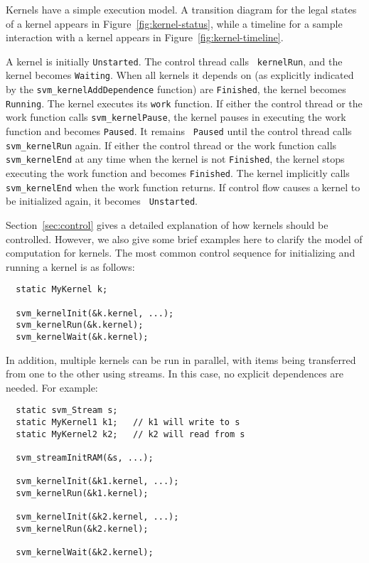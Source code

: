 Kernels have a simple execution model. A transition diagram for the
legal states of a kernel appears in Figure~\ref{fig:kernel-status},
while a timeline for a sample interaction with a kernel appears in
Figure~\ref{fig:kernel-timeline}.

A kernel is initially {\tt Unstarted}.  The control thread calls {\tt
kernelRun}, and the kernel becomes {\tt Waiting}.  When all kernels it
depends on (as explicitly indicated by the {\tt svm\_kernelAddDependence}
function) are {\tt Finished}, the kernel becomes {\tt Running}. The
kernel executes its {\tt work} function.  If either the control thread
or the work function calls {\tt svm\_kernelPause}, the kernel pauses in
executing the work function and becomes {\tt Paused}. It remains {\tt
Paused} until the control thread calls {\tt svm\_kernelRun} again. If
either the control thread or the work function calls {\tt svm\_kernelEnd}
at any time when the kernel is not {\tt Finished}, the kernel stops
executing the work function and becomes {\tt Finished}. The kernel
implicitly calls {\tt svm\_kernelEnd} when the work function returns. If
control flow causes a kernel to be initialized again, it becomes {\tt
Unstarted}.

Section~\ref{sec:control} gives a detailed explanation of how kernels
should be controlled.  However, we also give some brief examples here
to clarify the model of computation for kernels.  The most common
control sequence for initializing and running a kernel is as follows:

{\small
\begin{verbatim}
  static MyKernel k;

  svm_kernelInit(&k.kernel, ...);
  svm_kernelRun(&k.kernel);
  svm_kernelWait(&k.kernel);
\end{verbatim}}

In addition, multiple kernels can be run in parallel, with items being
transferred from one to the other using streams.  In this case, no
explicit dependences are needed.  For example:

{\small
\begin{verbatim}
  static svm_Stream s;
  static MyKernel1 k1;   // k1 will write to s
  static MyKernel2 k2;   // k2 will read from s

  svm_streamInitRAM(&s, ...);

  svm_kernelInit(&k1.kernel, ...);  
  svm_kernelRun(&k1.kernel);

  svm_kernelInit(&k2.kernel, ...);
  svm_kernelRun(&k2.kernel);

  svm_kernelWait(&k2.kernel);
\end{verbatim}}

